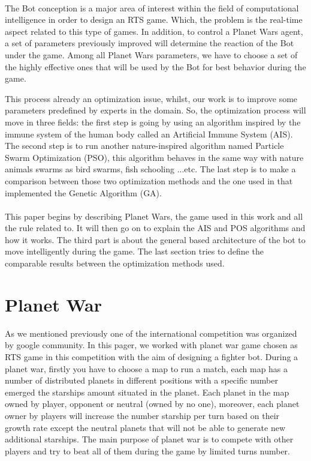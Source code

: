 \documentclass[]{interact}
\theoremstyle{plain}%
\theoremstyle{definition}
\theoremstyle{remark}
\begin{document}
\paragraph*{}
The Bot conception is a major area of interest\cite{doc4} within the field of computational intelligence in order to design an RTS game. Which, the problem is the real-time aspect related to this type of games. In addition, to control a Planet Wars agent, a set of parameters previously improved will determine the reaction of the Bot under the game. Among all Planet Wars parameters, we have to choose a set of the highly effective ones\cite{doc5} that will be used by the Bot for best behavior during the game.\par
This process already an optimization issue\cite{doc5}, whilst, our work is to improve some parameters predefined by experts in the domain. So, the optimization process will move in three fields: the first step is going by using an algorithm inspired by the immune system of the human body called an Artificial Immune System (AIS). The second step is to run another nature-inspired algorithm named Particle Swarm Optimization (PSO), this algorithm behaves in the same way with nature animals swarms as bird swarms, fish schooling ...etc. The last step is to make a comparison between those two optimization methods and the one used in\cite{doc1} that implemented the Genetic Algorithm (GA).

\paragraph*{}
This paper begins by describing Planet Wars, the game used in this work and all the rule related to. It will then go on to explain the AIS and POS algorithms and how it works. The third part is about the general based architecture of the bot to move intelligently during the game. The last section tries to define the comparable results between the optimization methods used.

\section{Planet War}

As we mentioned previously one of the international competition was organized by google community. In this pager, we worked with planet war game chosen as RTS game in this competition with the aim of designing a fighter bot. During a planet war\cite{doc1}, firstly you have to choose a map to run a match, each map has a number of distributed planets in different positions with a specific number emerged the starships amount situated in the planet. Each planet in the map owned by player, opponent or neutral (owned by no one), moreover, each planet owner by players will increase the number starship per turn based on their growth rate except the neutral planets that will not be able to generate new additional starships. The main purpose of planet war\cite{doc1} is to compete with other players and try to beat all of them during the game by limited turns number.  \\
\end{document}
